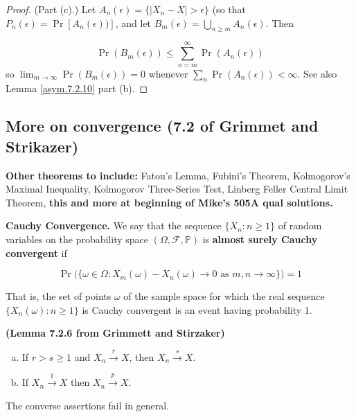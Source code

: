 \begin{proof}(Part (c).) Let \(A_n(\epsilon) = \{|X_n - X| > \epsilon\}\) (so that \(P_n(\epsilon) = \Pr[A_n(\epsilon))]\), and let \(B_m(\epsilon) = \bigcup_{n \geq m} A_n(\epsilon)\). Then

\[
\Pr(B_m(\epsilon)) \leq \sum_{n=m}^\infty \Pr(A_n(\epsilon))
\]
so \(\lim_{m \to \infty} \Pr(B_m(\epsilon)) = 0\) whenever \(\sum_n \Pr(A_n(\epsilon)) < \infty\). See also Lemma \ref{asym.7.2.10} part (b).\end{proof}

\subsection{More on convergence (7.2 of Grimmet and Strikazer)}

\textbf{Other theorems to include:} Fatou's Lemma, Fubini's Theorem, Kolmogorov's Maximal Inequality, Kolmogorov Three-Series Test, Linberg Feller Central Limit Theorem, \textbf{this and more at beginning of Mike's 505A qual solutions.}

\begin{definition} \textbf{Cauchy Convergence.} We say that the sequence \(\{X_n: n \geq 1\}\) of random variables on the probability space \((\Omega, \mathcal{F}, \mathbb{P})\) is \textbf{almost surely Cauchy convergent} if

\[
\Pr \big( \{\omega \in \Omega: X_m(\omega) - X_n(\omega) \to 0 \text{ as } m, n \to \infty \} \big) = 1
\]

That is, the set of points \(\omega\) of the sample space for which the real sequence \(\{X_n(\omega): n \geq 1\}\) is Cauchy convergent is an event having probability 1.
\end{definition}

\begin{lemma}\label{asym.7.2.6} \textbf{(Lemma 7.2.6 from Grimmett and Stirzaker)} 
\begin{enumerate}[(a)]
\item If \(r > s \geq 1\) and \(X_n \xrightarrow{r} X\), then \(X_n \xrightarrow{s} X\).
\item If \(X_n \xrightarrow{1} X\) then \(X_n \xrightarrow{p} X\). 
\end{enumerate}
The converse assertions fail in general.
\end{lemma}

